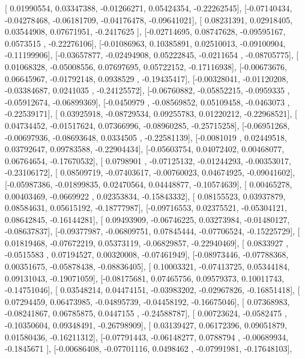 \documentclass{article}
\begin{document}
       [ 0.01990554,  0.03347388, -0.01266271,  0.05424354, -0.22262545],
       [-0.07140434, -0.04278468, -0.06181709, -0.04176478, -0.09641021],
       [ 0.08231391,  0.02918405,  0.03544908,  0.07671951, -0.2417625 ],
       [-0.02714695,  0.08747628, -0.09595167,  0.0573515 , -0.22276106],
       [-0.01086963,  0.10385891,  0.02510013, -0.09100904, -0.11199906],
       [-0.03657877, -0.02494908,  0.05222845, -0.0211654 , -0.08705775],
       [ 0.01068328, -0.05008556,  0.07697695,  0.05722152, -0.17116938],
       [-0.00673676,  0.06645967, -0.01792148,  0.0938529 , -0.19435417],
       [-0.00328041, -0.01120208, -0.03384687,  0.0241035 , -0.24125572],
       [-0.06760882, -0.05852215, -0.0959335 , -0.05912674, -0.06899369],
       [-0.0450979 , -0.08569852,  0.05109458, -0.0463073 , -0.22539171],
       [ 0.03925918, -0.08729534,  0.09255783,  0.01220212, -0.22968521],
       [ 0.04734452, -0.01517624,  0.07366996, -0.08960285, -0.25715258],
       [-0.06951268, -0.00697936, -0.08693648,  0.0334505 , -0.22581139],
       [-0.0081019 ,  0.02449518,  0.03792647,  0.09783588, -0.22904434],
       [-0.05603754,  0.04072402,  0.00468077,  0.06764654, -0.17670532],
       [ 0.0798901 , -0.07125132, -0.01244293, -0.00353017, -0.23106172],
       [ 0.08509719, -0.07403617, -0.00760023,  0.04674925, -0.09041602],
       [-0.05987386, -0.01899835,  0.02470564,  0.04448877, -0.10574639],
       [ 0.00465278,  0.00403469, -0.0669922 ,  0.02353834, -0.15843332],
       [ 0.08155523,  0.03937879,  0.08584631,  0.05615192, -0.18777987],
       [-0.09716553,  0.02375521, -0.05304121,  0.08642845, -0.16144281],
       [ 0.09493909, -0.06746225,  0.03273984, -0.01480127, -0.08637837],
       [-0.09377987, -0.06809751,  0.07845444, -0.07706524, -0.15225729],
       [ 0.01819468, -0.07672219,  0.05373119, -0.06829857, -0.22940469],
       [ 0.0833927 , -0.0515583 ,  0.07194527,  0.00320008, -0.07461949],
       [-0.08973446, -0.07788368,  0.00351675, -0.05878438, -0.08836405],
       [ 0.10003321, -0.07413725,  0.05344184,  0.09131043, -0.19071059],
       [-0.08175681,  0.07465756,  0.09579373,  0.10011743, -0.14751046],
       [ 0.03548214,  0.04474151, -0.03983202, -0.02967826, -0.16851418],
       [ 0.07294459,  0.06473985, -0.04895739, -0.04458192, -0.16675046],
       [ 0.07368983, -0.08241867,  0.06785875,  0.0447155 , -0.24588787],
       [ 0.00723624, -0.0582475 , -0.10350604,  0.09348491, -0.26798909],
       [ 0.03139427,  0.06172396,  0.09051879,  0.01580436, -0.16211312],
       [-0.07791443, -0.06148277,  0.0788794 , -0.00689934, -0.1845671 ],
       [-0.00686408, -0.07701116,  0.0498462 , -0.07991981, -0.17648103],
\end{document}
